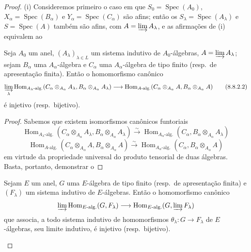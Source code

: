\begin{proof}
(i) Consideremos primeiro o caso em que $S_0=\operatorname{Spec}(A_0)$, $X_\alpha=\operatorname{Spec}(B_\alpha)$ e $Y_\alpha=\operatorname{Spec}(C_\alpha)$ são afins; então os $S_\lambda=\operatorname{Spec}(A_\lambda)$ e $S=\operatorname{Spec}(A)$ também são afins, com $A=\varinjlim A_\lambda$, e as afirmações de (i) equivalem ao

\begin{lemma}[8.8.2.1]
\label{IV.8.8.2.1}
Seja $A_0$ um anel, $(A_\lambda)_{\lambda\in L}$ um sistema indutivo de $A_0$-álgebras, $A=\varinjlim A_\lambda$; sejam $B_\alpha$ uma $A_\alpha$-álgebra e $C_\alpha$ uma $A_\alpha$-álgebra de tipo finito (resp.\ de apresentação finita).
Então o homomorfismo canônico
\[
  \varinjlim_\lambda\operatorname{Hom}_{A_\lambda\text{-alg.}}(C_\alpha\otimes_{A_\alpha}A_\lambda,B_\alpha\otimes_{A_\alpha}A_\lambda)\to\operatorname{Hom}_{A\text{-alg.}}(C_\alpha\otimes_{A_\alpha}A,B_\alpha\otimes_{A_\alpha}A)
  \tag{8.8.2.2}\label{IV.8.8.2.2}
\]
é injetivo (resp.\ bijetivo).
\end{lemma}

\begin{proof}
Sabemos que existem isomorfismos canônicos funtoriais
\[
  \operatorname{Hom}_{A_\lambda\text{-alg.}}(C_\alpha\otimes_{A_\alpha}A_\lambda,B_\alpha\otimes_{A_\alpha}A_\lambda)\xrightarrow{\sim}\operatorname{Hom}_{A_\alpha\text{-alg.}}(C_\alpha,B_\alpha\otimes_{A_\alpha}A_\lambda)
\]
\[
  \operatorname{Hom}_{A\text{-alg.}}(C_\alpha\otimes_{A_\alpha}A,B_\alpha\otimes_{A_\alpha}A)\xrightarrow{\sim}\operatorname{Hom}_{A_\alpha\text{-alg.}}(C_\alpha,B_\alpha\otimes_{A_\alpha}A)
\]
em virtude da propriedade universal do produto tensorial de duas álgebras.
Basta, portanto, demonstrar o
\end{proof}

\begin{lemma}[8.8.2.3]
\label{IV.8.8.2.3}
Sejam $E$ um anel, $G$ uma $E$-álgebra de tipo finito (resp.\ de apresentação finita) e $(F_\lambda)$ um sistema indutivo de $E$-álgebras.
Então o homomorfismo canônico
\[
  \varinjlim\operatorname{Hom}_{E\text{-alg.}}(G,F_\lambda)\to\operatorname{Hom}_{E\text{-alg.}}(G,\varinjlim F_\lambda)
\]
que associa, a todo sistema indutivo de homomorfismos $\theta_\lambda:G\to F_\lambda$ de $E$-álgebras, seu limite indutivo, é injetivo (resp.\ bijetivo).
\end{lemma}


\end{proof}
